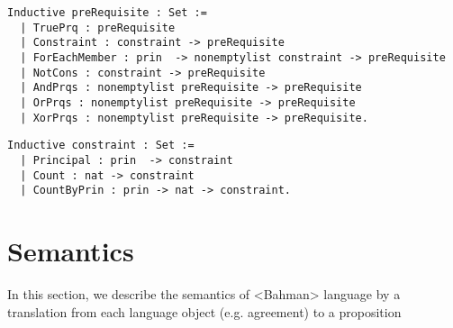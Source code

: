 \lstset{language=Coq}
\begin{lstlisting}[frame=single, caption={preRequisite},label={lst:preRequisite}]
Inductive preRequisite : Set :=
  | TruePrq : preRequisite
  | Constraint : constraint -> preRequisite 
  | ForEachMember : prin  -> nonemptylist constraint -> preRequisite
  | NotCons : constraint -> preRequisite 
  | AndPrqs : nonemptylist preRequisite -> preRequisite
  | OrPrqs : nonemptylist preRequisite -> preRequisite
  | XorPrqs : nonemptylist preRequisite -> preRequisite.
\end{lstlisting}

\lstset{language=Coq}
\begin{lstlisting}[frame=single, caption={preRequisite},label={lst:preRequisite}]
Inductive constraint : Set :=
  | Principal : prin  -> constraint 
  | Count : nat -> constraint 
  | CountByPrin : prin -> nat -> constraint.
\end{lstlisting}


\section{Semantics}


In this section, we describe the semantics of <Bahman> language by a translation from each language object (e.g. agreement) to a proposition 
%